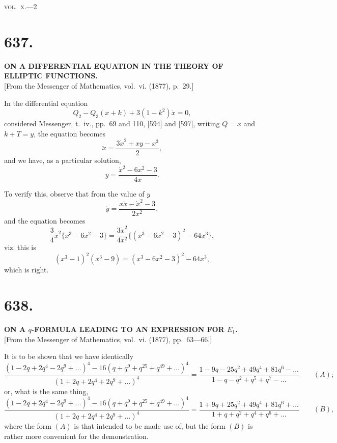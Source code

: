 \documentclass[11pt,a4paper]{book}
\begin{document}
\hfill\textsc{vol.~x.}---2

\clearpage
\setcounter{page}{24}

\section*{637.}

\begin{center}
\textbf{ON A DIFFERENTIAL EQUATION IN THE THEORY OF ELLIPTIC FUNCTIONS.}\\[1em]
[From the Messenger of Mathematics, vol.~vi. (1877), p.~29.]
\end{center}

In the differential equation
\[
Q_2 - Q_3(x + k) + 3(1-k^2)\dot{x} = 0,
\]
considered Messenger, t.~iv., pp.~69 and 110, [594] and [597], writing $Q = x$ and $k + T = y$, the equation becomes
\[
\ddot{x} = \frac{3\dot{x}^2 + xy - x^3}{2},
\]
and we have, as a particular solution,
\[
y = \frac{\dot{x}^2 - 6x^2 - 3}{4x}.
\]

To verify this, observe that from the value of $y$
\[
\dot{y} = \frac{x\ddot{x} - \dot{x}^2 - 3}{2x^2},
\]
and the equation becomes
\[
\frac{3}{4}\dot{x}^2 \{x^3 - 6x^2 - 3\} = \frac{3\dot{x}^2}{4x^2}\{(x^3 - 6x^2 - 3)^2 - 64x^3\},
\]
viz. this is
\[
(x^3-1)^2(x^3-9) = (x^3 - 6x^2 - 3)^2 - 64x^3,
\]
which is right.

\clearpage
\setcounter{page}{25}

\section*{638.}

\begin{center}
\textbf{ON A $q$-FORMULA LEADING TO AN EXPRESSION FOR $E_1$.}\\[1em]
[From the Messenger of Mathematics, vol.~vi. (1877), pp.~63---66.]
\end{center}

It is to be shown that we have identically
\[
\frac{(1-2q+2q^4-2q^9+\ldots)^4 - 16(q+q^9+q^{25}+q^{49}+\ldots)^4}{(1+2q+2q^4+2q^9+\ldots)^4} = \frac{1 - 9q - 25q^2 + 49q^4 + 81q^6 - \ldots}{1 - q - q^2 + q^5 + q^7 - \ldots} \qquad (A);
\]
or, what is the same thing,
\[
\frac{(1-2q+2q^4-2q^9+\ldots)^4 - 16(q+q^9+q^{25}+q^{49}+\ldots)^4}{(1+2q+2q^4+2q^9+\ldots)^4} = \frac{1 + 9q + 25q^2 + 49q^4 + 81q^6 + \ldots}{1 + q + q^2 + q^4 + q^6 + \ldots} \qquad (B),
\]
where the form $(A)$ is that intended to be made use of, but the form $(B)$ is rather more convenient for the demonstration.
\end{document}
